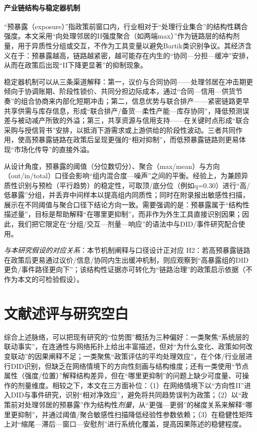 \paragraph{产业链结构与稳定器机制}
“预暴露（exposure）”指政策前窗口内，行业相对于“处理行业集合”的结构性耦合强度。本文采用“向处理邻居的II强度聚合（如两端max）”作为链路层的结构剂量，用于异质性分组或交互，不作为工具变量以避免Bartik类识别争议\citep{goldsmithpinkham2020bartik}。其经济含义在于：预暴露越高，链路越紧密，越可能存在内生的“协同—分担—缓冲”安排，从而在政策后出现“II下降更显著”的抑制现象。

稳定器机制可以从三条渠道解释：第一，议价与合同协同——处理邻居在冲击期更倾向于协调账期、阶段性锁价、共同分担边际成本，通过“合同—信用—供货节奏”的组合协商来内部化短期冲击；第二，信息优势与联合排产——紧密链路更早共享供需与库存信息，形成“联合排产/备货—柔性产能—库存协同”，降低预测误差与被动减产所致的外溢；第三，共享资源与信用支持——在关键时点形成“联合采购与授信背书”安排，以抵消下游需求或上游供给的阶段性波动。三者共同作用，使高预暴露链路在政策后呈现更强的“相对抑制”，而低预暴露链路则更易体现“市场化传导”的直接外溢。

从设计角度，预暴露的阈值（分位数切分）、聚合（max/mean）与方向（out/in/total）口径会影响“组内混合度—噪声”之间的平衡。经验上，为兼顾异质性识别与预检（平行趋势）的稳定性，可取顶/底分位（例如q=0.30）进行“高/低暴露”分组，并丢弃中间样本以提高组内同质性；同时在附录报出敏感性扫描，展示在不同阈值与聚合口径下结论方向一致。需要强调的是：预暴露属于“结构性描述量”，目标是帮助解释“在哪里更抑制”，而非作为外生工具直接识别因果；因此，我们把它限定在“分组/交互—剂量—响应”的语法中与DID/事件研究配合使用。

\noindent\textit{与本研究假设的对应关系}：本节机制阐释与口径设计正对应 H2：若高预暴露链路在政策后更易通过议价/信息/协同内生出缓冲机制，则应观察到“高暴露组的DID更负/事件路径更向下”；该结构性证据亦可转化为“链路治理”的政策启示依据（不作为本文的可检验假设）。
\section{文献述评与研究空白}
综合上述脉络，可以把现有研究的“位势图”概括为三种偏好：一类聚焦“系统层的联动事实”，在连通性与网络拓扑上给出丰富描述，但对“为什么变化、政策如何改变联动”的因果阐释不足；一类聚焦“政策评估的平均处理效应”，在个体/行业层进行DID识别，但缺乏在网络情境下的方向性刻画与结构维度；还有一类使用“节点属性（强度/位置）”解释结构差异，但在“哪里更抑制”的问题上缺少可度量、可操作的剂量维度。相较之下，本文在三方面补位：（1）在网络情境下以“方向性II”进入DID与事件研究，识别“相对净效应”，避免将共同趋势误判为政策；（2）以“政策前对处理邻居的预暴露”作为结构性\emph{剂量}，从“更强—更弱”的梯度关系来解释“哪里更抑制”，并通过阈值/聚合敏感性扫描降低经验性参数依赖；（3）在稳健性矩阵上对“缩尾—滞后—窗口—安慰剂”进行系统化覆盖，提高因果陈述的稳健程度。

